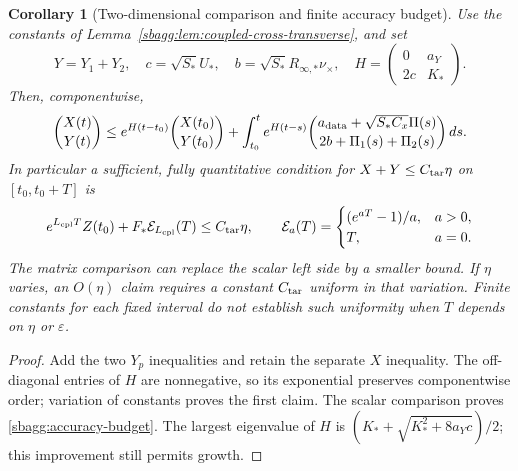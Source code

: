 \documentclass{article} %
\theoremstyle{plain}
\newtheorem{corollary}[theorem]{Corollary}
\theoremstyle{definition}
\theoremstyle{remark}
\begin{document}
\begin{corollary}[Two-dimensional comparison and finite accuracy budget]
\label{sbagg:budget}
Use the constants of Lemma~\ref{sbagg:lem:coupled-cross-transverse}, and set
\[
 Y=Y_1+Y_2,\quad c=\sqrt{S_*}U_*,\quad
 b=\sqrt{S_*}R_{\infty,*}\nu_\times,\quad
 H=\begin{pmatrix}0&a_Y\\2c&K_*\end{pmatrix}.
\]
Then, componentwise,
\[
 \binom{X(t)}{Y(t)}\le
 e^{H(t-t_0)}\binom{X(t_0)}{Y(t_0)}+
 \int_{t_0}^t e^{H(t-s)}
 \binom{a_{\rm data}+\sqrt{S_*C_x}\Pi(s)}
 {2b+\Pi_1(s)+\Pi_2(s)}\,ds.
\]
In particular a sufficient, fully quantitative condition for
$X+Y\le C_{\rm tar}\eta$ on $[t_0,t_0+T]$ is
\begin{equation}\label{sbagg:accuracy-budget}
 e^{L_{\rm cpl}T}Z(t_0)+F_*\mathcal E_{L_{\rm cpl}}(T)
 \le C_{\rm tar}\eta,
 \qquad
 \mathcal E_a(T)=\begin{cases}(e^{aT}-1)/a,&a>0,\\T,&a=0.\end{cases}
\end{equation}
The matrix comparison can replace the scalar left side by a smaller bound.
If $\eta$ varies, an $O(\eta)$ claim requires a constant $C_{\rm tar}$
uniform in that variation. Finite constants for each fixed interval do
not establish such uniformity when $T$ depends on $\eta$ or $\varepsilon$.
\end{corollary}
\begin{proof}
Add the two $Y_p$ inequalities and retain the separate $X$ inequality.
The off-diagonal entries of $H$ are nonnegative, so its exponential
preserves componentwise order; variation of constants proves the first
claim. The scalar comparison proves \eqref{sbagg:accuracy-budget}.
The largest eigenvalue of $H$ is
$(K_*+\sqrt{K_*^2+8a_Yc})/2$; this improvement still permits growth.
\end{proof}
\end{document}
